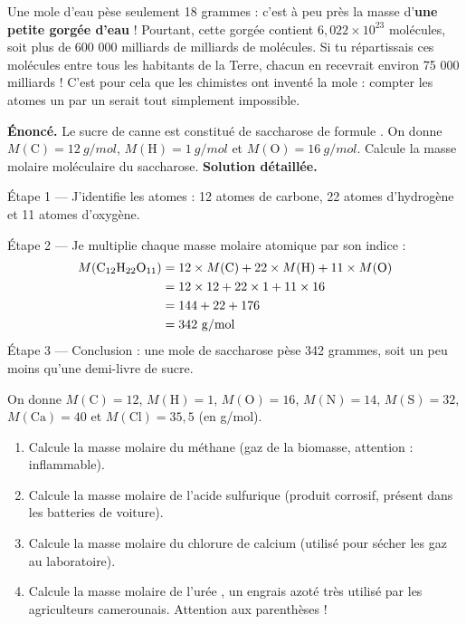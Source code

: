 \documentclass[11pt]{article}
\begin{document}
\begin{savaistu}
Une mole d'eau pèse seulement 18 grammes : c'est à peu près la masse d'\textbf{une petite gorgée d'eau} ! Pourtant, cette gorgée contient $6,022 \times 10^{23}$ molécules, soit plus de 600 000 milliards de milliards de molécules. Si tu répartissais ces molécules entre tous les habitants de la Terre, chacun en recevrait environ 75 000 milliards ! C'est pour cela que les chimistes ont inventé la mole : compter les atomes un par un serait tout simplement impossible.
\end{savaistu}

\begin{exoresolu}
\textbf{Énoncé.} Le sucre de canne est constitué de saccharose de formule . On donne $M(\mathrm{C}) = 12~\si{g/mol}$, $M(\mathrm{H}) = 1~\si{g/mol}$ et $M(\mathrm{O}) = 16~\si{g/mol}$. Calcule la masse molaire moléculaire du saccharose.
\tcblower
\textbf{Solution détaillée.}\par
Étape 1 — J'identifie les atomes : 12 atomes de carbone, 22 atomes d'hydrogène et 11 atomes d'oxygène.\par
Étape 2 — Je multiplie chaque masse molaire atomique par son indice :
\begin{align*}
M(\ce{C12H22O11}) &= 12 \times M(\mathrm{C}) + 22 \times M(\mathrm{H}) + 11 \times M(\mathrm{O}) \\
&= 12 \times 12 + 22 \times 1 + 11 \times 16 \\
&= 144 + 22 + 176 \\
&= 342~\si{g/mol}
\end{align*}
Étape 3 — Conclusion : une mole de saccharose pèse 342 grammes, soit un peu moins qu'une demi-livre de sucre.
\end{exoresolu}

\begin{exercice}
On donne $M(\mathrm{C}) = 12$, $M(\mathrm{H}) = 1$, $M(\mathrm{O}) = 16$, $M(\mathrm{N}) = 14$, $M(\mathrm{S}) = 32$, $M(\mathrm{Ca}) = 40$ et $M(\mathrm{Cl}) = 35,5$ (en \si{g/mol}).
\begin{enumerate}
\item Calcule la masse molaire du méthane  (gaz de la biomasse, attention : inflammable).
\item Calcule la masse molaire de l'acide sulfurique  (produit corrosif, présent dans les batteries de voiture).
\item Calcule la masse molaire du chlorure de calcium  (utilisé pour sécher les gaz au laboratoire).
\item Calcule la masse molaire de l'urée , un engrais azoté très utilisé par les agriculteurs camerounais. Attention aux parenthèses !
\end{enumerate}
\end{exercice}
\end{document}
